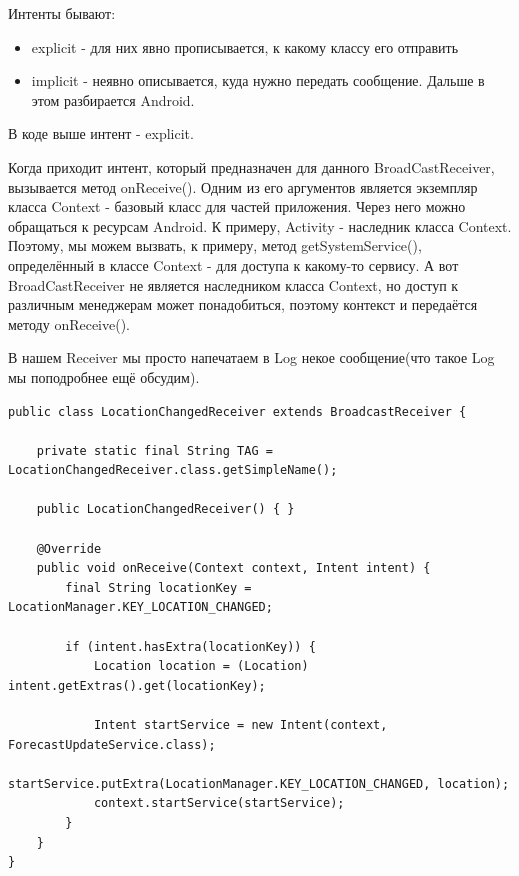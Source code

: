 \documentclass[12 pt]{article}
\begin{document}
      Интенты бывают:
      \begin{itemize}
      		\item explicit - для них явно прописывается, к какому классу его отправить
            \item implicit - неявно описывается, куда нужно передать сообщение. Дальше в этом разбирается Android.
      \end{itemize}
      В коде выше интент - explicit. 
    
    Когда приходит интент, который предназначен для данного BroadCastReceiver, вызывается метод onReceive(). Одним из его аргументов является экземпляр класса Context - базовый класс для частей приложения. Через него можно обращаться к ресурсам Android. К примеру, Activity - наследник класса Context. Поэтому, мы можем вызвать, к примеру, метод getSystemService(), определённый в классе Context - для доступа к какому-то сервису. А вот BroadCastReceiver не является наследником класса Context, но доступ к различным менеджерам может понадобиться, поэтому контекст и передаётся методу onReceive(). 
    
        В нашем Receiver мы просто напечатаем в Log некое сообщение(что такое Log мы поподробнее ещё обсудим). 
        
        \begin{lstlisting}
public class LocationChangedReceiver extends BroadcastReceiver {

    private static final String TAG = LocationChangedReceiver.class.getSimpleName();

    public LocationChangedReceiver() { }

    @Override
    public void onReceive(Context context, Intent intent) {
        final String locationKey = LocationManager.KEY_LOCATION_CHANGED;

        if (intent.hasExtra(locationKey)) {
            Location location = (Location) intent.getExtras().get(locationKey);

            Intent startService = new Intent(context, ForecastUpdateService.class);
            startService.putExtra(LocationManager.KEY_LOCATION_CHANGED, location);
            context.startService(startService);
        }
    }
}
    \end{lstlisting}
    
\end{document}
